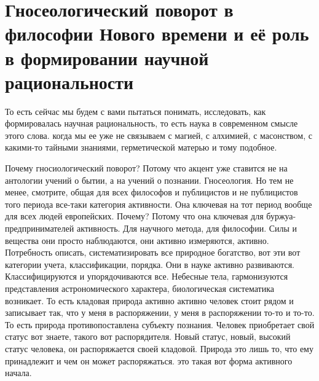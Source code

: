 
\section{Гносеологический поворот в философии Нового времени и её роль в формировании
научной рациональности}

То есть
сейчас мы будем с вами пытаться понимать, исследовать, как формировалась научная
рациональность, то есть наука в современном смысле этого слова. когда мы ее уже
не связываем с магией, с алхимией, с масонством, с какими-то тайными знаниями,
герметической матерью и тому подобное. 

Почему гносиологический
поворот? Потому что акцент уже ставится не на антологии учений о бытии, а на
учений о познании. Гносеология. Но тем не менее, смотрите, общая для всех
философов и публицистов и не публицистов того периода все-таки категория
активности. Она ключевая на тот период вообще для всех людей европейских.
Почему? Потому что она ключевая для буржуа-предпринимателей активность. Для
научного метода, для философии. Силы и вещества они просто наблюдаются, они
активно измеряются, активно. Потребность описать, систематизировать все
природное богатство, вот эти вот категории учета, классификации, порядка. Они в
науке активно развиваются. Классифицируются и упорядочиваются все. Небесные
тела, гармонизуются представления астрономического характера, биологическая
систематика возникает. То есть кладовая природа активно активно человек стоит
рядом и записывает так, что у меня в распоряжении, у меня в распоряжении то-то и
то-то. То есть природа противопоставлена субъекту познания. Человек приобретает
свой статус вот знаете, такого вот распорядителя. Новый статус, новый, высокий
статус человека, он распоряжается своей кладовой. Природа это лишь то, что ему
принадлежит и чем он может распоряжаться. это такая вот форма активного начала.


